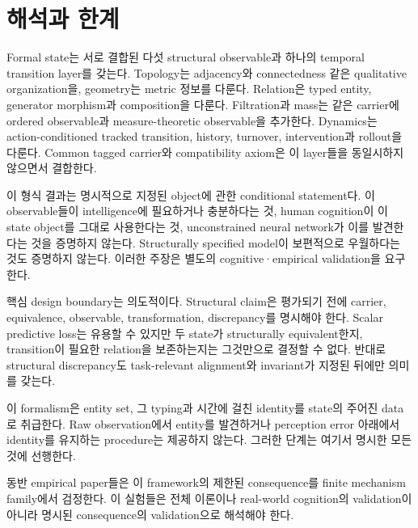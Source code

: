 \section{해석과 한계}

Formal state는 서로 결합된 다섯 structural observable과 하나의 temporal
transition layer를 갖는다. Topology는 adjacency와 connectedness 같은 qualitative
organization을, geometry는 metric 정보를 다룬다. Relation은 typed entity,
generator morphism과 composition을 다룬다. Filtration과 mass는 같은 carrier에
ordered observable과 measure-theoretic observable을 추가한다. Dynamics는
action-conditioned tracked transition, history, turnover, intervention과 rollout을
다룬다. Common tagged carrier와 compatibility axiom은 이 layer들을 동일시하지
않으면서 결합한다.

이 형식 결과는 명시적으로 지정된 object에 관한 conditional statement다. 이
observable들이 intelligence에 필요하거나 충분하다는 것, human cognition이 이
state object를 그대로 사용한다는 것, unconstrained neural network가 이를
발견한다는 것을 증명하지 않는다. Structurally specified model이 보편적으로
우월하다는 것도 증명하지 않는다. 이러한 주장은 별도의 cognitive·empirical
validation을 요구한다.

핵심 design boundary는 의도적이다. Structural claim은 평가되기 전에 carrier,
equivalence, observable, transformation, discrepancy를 명시해야 한다. Scalar predictive
loss는 유용할 수 있지만 두 state가 structurally equivalent한지, transition이 필요한
relation을 보존하는지는 그것만으로 결정할 수 없다. 반대로 structural discrepancy도
task-relevant alignment와 invariant가 지정된 뒤에만 의미를 갖는다.

이 formalism은 entity set, 그 typing과 시간에 걸친 identity를 state의 주어진 data로
취급한다. Raw observation에서 entity를 발견하거나 perception error 아래에서 identity를
유지하는 procedure는 제공하지 않는다. 그러한 단계는 여기서 명시한 모든 것에 선행한다.

동반 empirical paper들은 이 framework의 제한된 consequence를 finite mechanism
family에서 검정한다. 이 실험들은 전체 이론이나 real-world cognition의
validation이 아니라 명시된 consequence의 validation으로 해석해야 한다.
